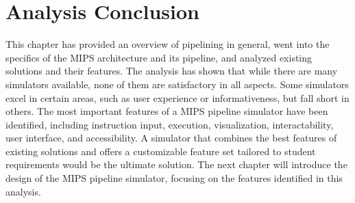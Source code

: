 \section{Analysis Conclusion}
This chapter has provided an overview of pipelining in general, went into the specifics of the MIPS architecture and its pipeline, and analyzed existing solutions and their features. The analysis has shown that while there are many simulators available, none of them are satisfactory in all aspects. Some simulators excel in certain areas, such as user experience or informativeness, but fall short in others. The most important features of a MIPS pipeline simulator have been identified, including instruction input, execution, visualization, interactability, user interface, and accessibility. A simulator that combines the best features of existing solutions and offers a customizable feature set tailored to student requirements would be the ultimate solution. The next chapter will introduce the design of the MIPS pipeline simulator, focusing on the features identified in this analysis.